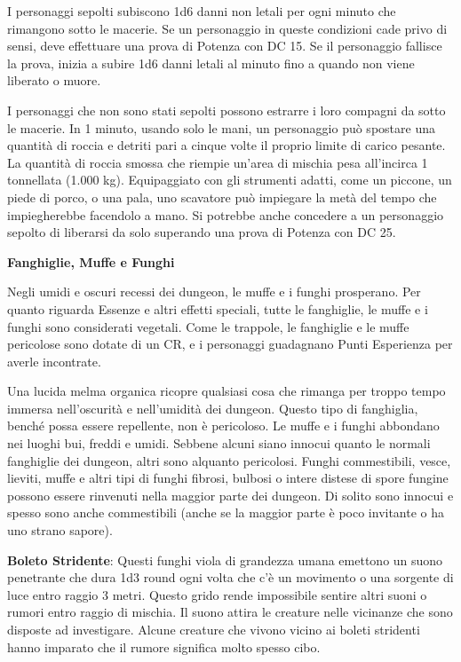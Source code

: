 \documentclass[a4paper,11pt,twoside,openany]{book}
\begin{document}
I personaggi sepolti subiscono 1d6 danni non letali per ogni minuto che rimangono sotto le macerie. Se un personaggio in queste condizioni cade privo di sensi, deve effettuare una prova di Potenza con DC 15. Se il personaggio fallisce la prova, inizia a subire 1d6 danni letali al minuto fino a quando non viene liberato o muore.

I personaggi che non sono stati sepolti possono estrarre i loro compagni da sotto le macerie. In 1 minuto, usando solo le mani, un personaggio può spostare una quantità di roccia e detriti pari a cinque volte il proprio limite di carico pesante. La quantità di roccia smossa che riempie un'area di mischia pesa all'incirca 1 tonnellata (1.000 kg). Equipaggiato con gli strumenti adatti, come un piccone, un piede di porco, o una pala, uno scavatore può impiegare la metà del tempo che impiegherebbe facendolo a mano. Si potrebbe anche concedere a un personaggio sepolto di liberarsi da solo superando una prova di Potenza con DC 25.

\textbf{Fanghiglie, Muffe e Funghi}

Negli umidi e oscuri recessi dei dungeon, le muffe e i funghi prosperano. Per quanto riguarda Essenze e altri effetti speciali, tutte le fanghiglie, le muffe e i funghi sono considerati vegetali. Come le trappole, le fanghiglie e le muffe pericolose sono dotate di un CR, e i personaggi guadagnano Punti Esperienza per averle incontrate.

Una lucida melma organica ricopre qualsiasi cosa che rimanga per troppo tempo immersa nell'oscurità e nell'umidità dei dungeon. Questo tipo di fanghiglia, benché possa essere repellente, non è pericoloso. Le muffe e i funghi abbondano nei luoghi bui, freddi e umidi. Sebbene alcuni siano innocui quanto le normali fanghiglie dei dungeon, altri sono alquanto pericolosi. Funghi commestibili, vesce, lieviti, muffe e altri tipi di funghi fibrosi, bulbosi o intere distese di spore fungine possono essere rinvenuti nella maggior parte dei dungeon. Di solito sono innocui e spesso sono anche commestibili (anche se la maggior parte è poco invitante o ha uno strano sapore).

\textbf{Boleto Stridente}: Questi funghi viola di grandezza umana emettono un suono penetrante che dura 1d3 round ogni volta che c'è un movimento o una sorgente di luce entro raggio 3 metri. Questo grido rende impossibile sentire altri suoni o rumori entro raggio di mischia. Il suono attira le creature nelle vicinanze che sono disposte ad investigare. Alcune creature che vivono vicino ai boleti stridenti hanno imparato che il rumore significa molto spesso cibo.
\end{document}
